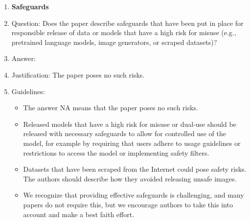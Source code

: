 \documentclass[letterpaper]{article}
\begin{document}
\begin{enumerate}
\item {\bf Safeguards}
    \item[] Question: Does the paper describe safeguards that have been put in place for responsible release of data or models that have a high risk for misuse (e.g., pretrained language models, image generators, or scraped datasets)?
    \item[] Answer: \answerNA{} %
    \item[] Justification: The paper poses no such risks.
    \item[] Guidelines:
    \begin{itemize}
        \item The answer NA means that the paper poses no such risks.
        \item Released models that have a high risk for misuse or dual-use should be released with necessary safeguards to allow for controlled use of the model, for example by requiring that users adhere to usage guidelines or restrictions to access the model or implementing safety filters. 
        \item Datasets that have been scraped from the Internet could pose safety risks. The authors should describe how they avoided releasing unsafe images.
        \item We recognize that providing effective safeguards is challenging, and many papers do not require this, but we encourage authors to take this into account and make a best faith effort.
    \end{itemize}


\end{enumerate}
\end{document}
